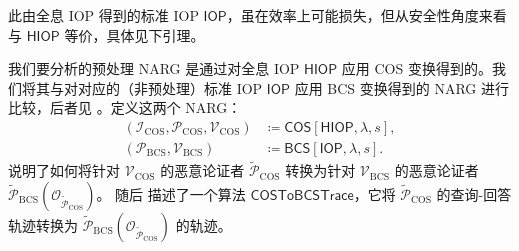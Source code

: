 \documentclass[american,singlepageview]{snargs-book-zh}
\newcommand{\Malicious}[1]{\tilde{#1}}
\newcommand{\DefineEqual}{\coloneqq}
\newcommand{\BlackBox}[1]{\mathcal{O}_{#1}}
\newcommand{\ProtoIndexer}{I}
\newcommand{\ProtoProver}{P}
\newcommand{\ProtoVerifier}{V}
\newcommand{\IOPSymbol}{\mathsf{IOP}}
\newcommand{\HIOPSymbol}{\mathsf{HIOP}}
\newcommand{\ARGFormat}[1]{\mathcal{#1}}
\newcommand{\ARGIndexer}{\ARGFormat{\ProtoIndexer}}
\newcommand{\ARGProver}{\ARGFormat{\ProtoProver}}
\newcommand{\ARGVerifier}{\ARGFormat{\ProtoVerifier}}
\newcommand{\SecurityParameter}{\lambda}
\newcommand{\PrivacyParameter}{s}
\newcommand{\FormatTransName}[1]{\bm{\mathsf{#1}}}
\newcommand{\BCSSymbol}{\FormatTransName{BCS}}
\newcommand{\COSSymbol}{\FormatTransName{COS}}
\newcommand{\FormatTransInputs}[3]{[#1,#2,#3]}
\newcommand{\BCSTransformation}[3]{\BCSSymbol\FormatTransInputs{#1}{#2}{#3}}
\newcommand{\COSTransformation}[3]{\COSSymbol\FormatTransInputs{#1}{#2}{#3}}
\newcommand{\BCSSubscript}{\scriptscriptstyle\mathrm{BCS}}
\newcommand{\BCSProver}{\ARGProver_{\BCSSubscript}}
\newcommand{\BCSVerifier}{\ARGVerifier_{\BCSSubscript}}
\newcommand{\COSSubscript}{\scriptscriptstyle\mathrm{COS}}
\newcommand{\COSIndexer}{\ARGIndexer_{\COSSubscript}}
\newcommand{\COSProver}{\ARGProver_{\COSSubscript}}
\newcommand{\COSVerifier}{\ARGVerifier_{\COSSubscript}}
\newcommand{\COSToBCSTrace}{\mathsf{COSToBCSTrace}}
\begin{document}
此由全息 IOP 得到的标准 IOP $\IOPSymbol$，虽在效率上可能损失，但从安全性角度来看与 $\HIOPSymbol$ 等价，具体见下引理。

我们要分析的预处理 NARG 是通过对全息 IOP $\HIOPSymbol$ 应用 COS 变换得到的。我们将其与对对应的（非预处理）标准 IOP $\IOPSymbol$ 应用 BCS 变换得到的 NARG 进行比较，后者见 。定义这两个 NARG：
\begin{align*}
  (\COSIndexer,\COSProver,\COSVerifier)
    &\DefineEqual \COSTransformation{\HIOPSymbol}{\SecurityParameter}{\PrivacyParameter},
  \\
  (\BCSProver,\BCSVerifier)
    &\DefineEqual \BCSTransformation{\IOPSymbol}{\SecurityParameter}{\PrivacyParameter}.
\end{align*}
 说明了如何将针对 $\COSVerifier$ 的恶意论证者
$\Malicious{\ARGProver}_{\COSSubscript}$ 转换为针对 $\BCSVerifier$ 的恶意论证者
$\Malicious{\ARGProver}_{\BCSSubscript}(\BlackBox{\Malicious{\ARGProver}_{\COSSubscript}})$。
随后  描述了一个算法 $\COSToBCSTrace$，它将
$\Malicious{\ARGProver}_{\COSSubscript}$ 的查询-回答轨迹转换为
$\Malicious{\ARGProver}_{\BCSSubscript}(\BlackBox{\Malicious{\ARGProver}_{\COSSubscript}})$ 的轨迹。
\end{document}
